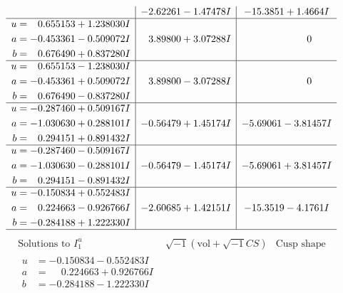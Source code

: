 \documentclass[1p]{elsarticle_modified}
\theoremstyle{definition}
\newcommand{\I}{\sqrt{-1}}
\begin{document}
$$\begin{array}{c|c|c}
 & -2.62261 - 1.47478 I & -15.3851 + 1.4664 I \\ \hline\begin{aligned}
u &= \phantom{-}0.655153 + 1.238030 I \\
a &= -0.453361 - 0.509072 I \\
b &= \phantom{-}0.676490 + 0.837280 I\end{aligned}
 & \phantom{-}3.89800 + 3.07288 I & \phantom{-0.000000 } 0 \\ \hline\begin{aligned}
u &= \phantom{-}0.655153 - 1.238030 I \\
a &= -0.453361 + 0.509072 I \\
b &= \phantom{-}0.676490 - 0.837280 I\end{aligned}
 & \phantom{-}3.89800 - 3.07288 I & \phantom{-0.000000 } 0 \\ \hline\begin{aligned}
u &= -0.287460 + 0.509167 I \\
a &= -1.030630 + 0.288101 I \\
b &= \phantom{-}0.294151 + 0.891432 I\end{aligned}
 & -0.56479 + 1.45174 I & -5.69061 - 3.81457 I \\ \hline\begin{aligned}
u &= -0.287460 - 0.509167 I \\
a &= -1.030630 - 0.288101 I \\
b &= \phantom{-}0.294151 - 0.891432 I\end{aligned}
 & -0.56479 - 1.45174 I & -5.69061 + 3.81457 I \\ \hline\begin{aligned}
u &= -0.150834 + 0.552483 I \\
a &= \phantom{-}0.224663 - 0.926766 I \\
b &= -0.284188 + 1.222330 I\end{aligned}
 & -2.60685 + 1.42151 I & -15.3519 - 4.1761 I\\
 \hline 
 \end{array}$$\newpage$$\begin{array}{c|c|c}  
\text{Solutions to }I^u_{1}& \I (\text{vol} + \sqrt{-1}CS) & \text{Cusp shape}\\
 \hline 
\begin{aligned}
u &= -0.150834 - 0.552483 I \\
a &= \phantom{-}0.224663 + 0.926766 I \\
b &= -0.284188 - 1.222330 I\end{aligned}

\end{array}$$
\end{document}
